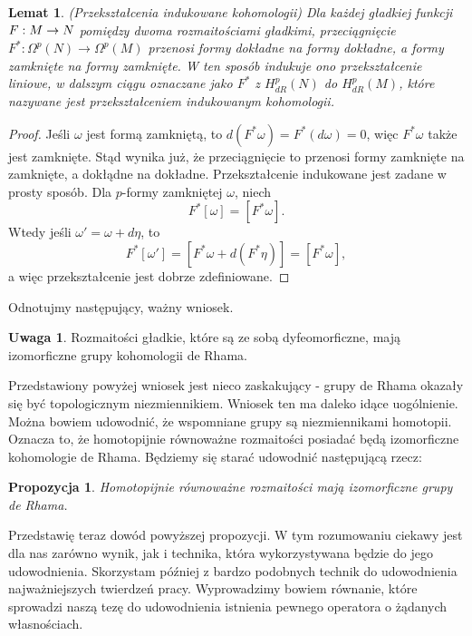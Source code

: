 \documentclass[licencjacka]{pracamgr}
\theoremstyle{definition}
\theoremstyle{definition}
\newtheorem{remark}{Uwaga}[section]
\theoremstyle{plain}
\newtheorem{lemma}{Lemat}[section]
\theoremstyle{plain}
\newtheorem{proposition}{Propozycja}[section]
\theoremstyle{plain}
\def\M{\ensuremath M}
\begin{document}
\begin{lemma}(Przekształcenia indukowane kohomologii)
  Dla każdej gładkiej funkcji $F: \M \rightarrow N$ pomiędzy
  dwoma rozmaitościami gładkimi, przeciągnięcie 
  $F^\ast: \Omega^p(N) \rightarrow \Omega^p (M)$ przenosi formy dokładne
  na formy dokładne, a formy zamknięte na formy zamknięte. W ten sposób indukuje
  ono przekształcenie liniowe, w dalszym ciągu oznaczane jako $F^\ast$ z
  $H^p_{dR} (N)$ do $H^p_{dR} (M)$, które nazywane jest przekształceniem indukowanym
  kohomologii. \\
\end{lemma}
\begin{proof}
  Jeśli $\omega$ jest formą zamkniętą, to $d(F^\ast \omega) = F^\ast(d \omega) = 0$,
  więc $F^\ast \omega$ także jest zamknięte. Stąd wynika już, że przeciągnięcie
  to przenosi formy zamknięte na zamknięte, a dokłądne na dokładne. Przekształcenie
  indukowane jest zadane w prosty sposób. Dla $p$-formy zamkniętej $\omega$, niech
  \[
  F^\ast[\omega] = [F^\ast\omega].
  \]
  Wtedy jeśli $\omega' = \omega + d \eta$, to 
  \[
  F^\ast[\omega'] = [F^\ast\omega + d(F^\ast\eta)] = [F^\ast\omega],
  \]
  a więc przekształcenie jest dobrze zdefiniowane.
\end{proof} 
Odnotujmy następujący, ważny wniosek.

\begin{remark}
  Rozmaitości gładkie, które są ze sobą dyfeomorficzne, mają izomorficzne grupy
  kohomologii de Rhama. \\
\end{remark}



Przedstawiony powyżej wniosek jest nieco zaskakujący - grupy de Rhama okazały
się być topologicznym niezmiennikiem. Wniosek ten ma daleko idące uogólnienie.
Można bowiem udowodnić, że wspomniane grupy są niezmiennikami homotopii. Oznacza
to, że homotopijnie równoważne rozmaitości posiadać będą izomorficzne kohomologie
de Rhama. Będziemy się starać udowodnić następującą rzecz:

\begin{proposition}
    Homotopijnie równoważne rozmaitości mają izomorficzne grupy de Rhama.
\end{proposition}

Przedstawię teraz dowód powyższej propozycji.  W tym rozumowaniu ciekawy jest
dla nas zarówno wynik, jak i technika, która wykorzystywana będzie do jego
udowodnienia.  Skorzystam później z bardzo podobnych technik do udowodnienia
najważniejszych twierdzeń pracy.  Wyprowadzimy bowiem równanie, które sprowadzi
naszą tezę do udowodnienia istnienia pewnego operatora o żądanych własnościach.  \\
\end{document}
